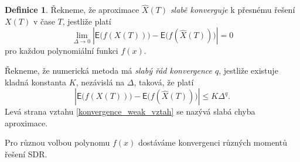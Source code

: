 \documentclass[a4paper,12pt]{report}
\theoremstyle{definition} \newtheorem{definice}[veta]{Definice}
\theoremstyle{remark}
\begin{document}
\begin{definice}\label{konvergence_weak_def}
Řekneme, že aproximace $\hat X(T)$ \textit{slabě konverguje} k přesnému řešení $X(T)$ v čase $T$, jestliže platí
\begin{equation}
\lim_{\Delta\to0}\left|\mathsf{E}\big(f(X(T))\big)-\mathsf{E}\big(f(\hat X(T))\big)\right|=0
\end{equation}
pro každou polynomiální funkci $f(x)$.

Řekneme, že numerická metoda má \textit{slabý řád konvergence $q$}, jestliže existuje kladná konstanta $K$, nezávislá na $\Delta$, taková, že platí
\begin{equation}\label{konvergence_weak_vztah}
\left|\mathsf{E}\big(f(X(T))\big)-\mathsf{E}\big(f(\hat X(T))\big)\right|\leq K\Delta^q.
\end{equation}
Levá strana vztahu \eqref{konvergence_weak_vztah} se nazývá slabá chyba aproximace.
\end{definice}
Pro různou volbou polynomu $f(x)$ dostáváme konvergenci různých momentů řešení SDR.
\end{document}
